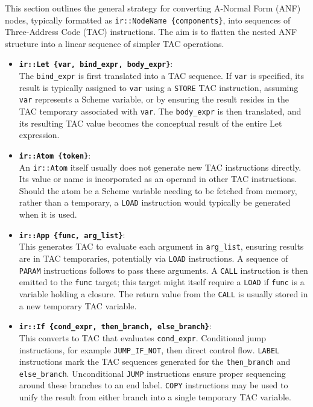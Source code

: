 \documentclass[final]{cmpreport_02}
\newcommand{\irnode}[1]{\texttt{ir::#1}}
\begin{document}
This section outlines the general strategy for converting A-Normal Form (ANF) nodes, typically formatted as \texttt{ir::NodeName \{components\}}, into sequences of Three-Address Code (TAC) instructions. The aim is to flatten the nested ANF structure into a linear sequence of simpler TAC operations.

\begin{itemize}[itemsep=3pt]
    \item \textbf{\irnode{Let \{var, bind\_expr, body\_expr\}}}: \\
        The \texttt{bind\_expr} is first translated into a TAC sequence. If \texttt{var} is specified, its result is typically assigned to \texttt{var} using a \texttt{STORE} TAC instruction, assuming \texttt{var} represents a Scheme variable, or by ensuring the result resides in the TAC temporary associated with \texttt{var}. The \texttt{body\_expr} is then translated, and its resulting TAC value becomes the conceptual result of the entire Let expression.
    \item \textbf{\irnode{Atom \{token\}}}: \\
        An \irnode{Atom} itself usually does not generate new TAC instructions directly. Its value or name is incorporated as an operand in other TAC instructions. Should the atom be a Scheme variable needing to be fetched from memory, rather than a temporary, a \texttt{LOAD} instruction would typically be generated when it is used.
    \item \textbf{\irnode{App \{func, arg\_list\}}}: \\
        This generates TAC to evaluate each argument in \texttt{arg\_list}, ensuring results are in TAC temporaries, potentially via \texttt{LOAD} instructions. A sequence of \texttt{PARAM} instructions follows to pass these arguments. A \texttt{CALL} instruction is then emitted to the \texttt{func} target; this target might itself require a \texttt{LOAD} if \texttt{func} is a variable holding a closure. The return value from the \texttt{CALL} is usually stored in a new temporary TAC variable.
    \item \textbf{\irnode{If \{cond\_expr, then\_branch, else\_branch\}}}: \\
        This converts to TAC that evaluates \texttt{cond\_expr}. Conditional jump instructions, for example \texttt{JUMP\_IF\_NOT}, then direct control flow. \texttt{LABEL} instructions mark the TAC sequences generated for the \texttt{then\_branch} and \texttt{else\_branch}. Unconditional \texttt{JUMP} instructions ensure proper sequencing around these branches to an end label. \texttt{COPY} instructions may be used to unify the result from either branch into a single temporary TAC variable.

\end{itemize}
\end{document}
